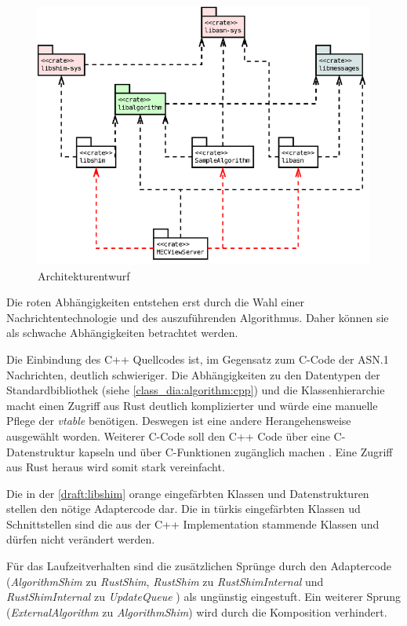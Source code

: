 \begin{figure}[H]
	\centering
	\includegraphics[width=1.9\textwidth]{dia/architecture_v2_packages}
	\caption{Architekturentwurf}
	\label{draft:architecture_v2_packages}
\end{figure}

Die roten Abhängigkeiten entstehen erst durch die Wahl einer Nachrichtentechnologie und des auszuführenden Algorithmus.
Daher können sie als schwache Abhängigkeiten betrachtet werden.


Die Einbindung des C++ Quellcodes ist, im Gegensatz zum C-Code der ASN.1 Nachrichten, deutlich schwieriger.
Die Abhängigkeiten zu den Datentypen der Standardbibliothek (siehe \autoref{class_dia:algorithm:cpp}) und die Klassenhierarchie macht einen Zugriff aus Rust deutlich komplizierter und würde eine manuelle Pflege der \textit{vtable} benötigen.
Deswegen ist eine andere Herangehensweise ausgewählt worden.
Weiterer C-Code soll den C++ Code über eine C-Datenstruktur kapseln und über C-Funktionen zugänglich machen \cite[700]{goll2018entwurfsprinzipien}.
Eine Zugriff aus Rust heraus wird somit stark vereinfacht.

Die in der \autoref{draft:libshim} orange eingefärbten Klassen und Datenstrukturen stellen den nötige Adaptercode dar.
Die in türkis eingefärbten Klassen ud Schnittstellen sind die aus der C++ Implementation stammende Klassen und dürfen nicht verändert werden.

Für das Laufzeitverhalten sind die zusätzlichen Sprünge durch den Adaptercode (\textit{AlgorithmShim} zu \textit{RustShim}, \textit{RustShim} zu \textit{RustShimInternal} und \textit{RustShimInternal} zu \textit{UpdateQueue} ) als ungünstig eingestuft.
Ein weiterer Sprung (\textit{ExternalAlgorithm} zu \textit{AlgorithmShim}) wird durch die Komposition verhindert.

